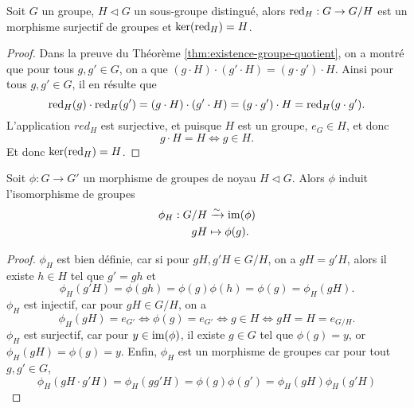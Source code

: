 \begin{proposition}
	Soit $G$ un groupe, $H \triangleleft G$ un sous-groupe distingué,
	alors $\operatorname{red}_H : G \to G/H$ est un morphisme surjectif de groupes
	et $\ker(\operatorname{red}_H) = H$.
\end{proposition}

\begin{proof}	
	Dans la preuve du Théorème \ref{thm:existence-groupe-quotient},
	on a montré que pour tous
	$g, g' \in G$, on a que $(g \cdot H) \cdot (g' \cdot H) = (g \cdot g') \cdot H$.
	Ainsi pour tous $g, g' \in G$, il en résulte que
	\begin{equation*}
		\operatorname{red}_H(g) \cdot \operatorname{red}_H(g') = (g \cdot H) \cdot (g' \cdot H)
		= (g \cdot g') \cdot H = \operatorname{red}_H(g \cdot g').
	\end{equation*}
	L'application $red_H$ est surjective, et puisque $H$ est un groupe, $e_G \in H$,
	et donc
	\begin{equation*}
		g \cdot H = H \iff g \in H.	
	\end{equation*}
	Et donc $\ker(\operatorname{red}_H) = H$.
\end{proof}

\begin{theorem}
	\label{thm:noyau-image}
	Soit $\phi : G \to G'$ un morphisme de groupes de noyau $H \triangleleft G$.
	Alors $\phi$ induit l'isomorphisme de groupes
	\begin{align*}
		\phi_H: G/H &\xrightarrow{\sim} \operatorname{im}(\phi)\\
		g H &\mapsto \phi(g).
	\end{align*}
\end{theorem}

\begin{proof}
	$\phi_H$ est bien définie, car si pour $g H, g'H \in G/H$, on a $gH = g'H$,
	alors il existe $h \in H$ tel que $g' = gh$ et
	\begin{equation*}
		\phi_H(g'H) = \phi(gh) = \phi(g)\phi(h) = \phi(g) = \phi_H(gH).
	\end{equation*}
	$\phi_H$ est injectif, car pour $gH \in G/H$, on a
	\begin{equation*}
		\phi_H(gH) = e_{G'} \iff \phi(g) = e_{G'} \iff g \in H \iff gH = H = e_{G/H}.
	\end{equation*}
	$\phi_H$ est surjectif, car pour $y \in \operatorname{im}(\phi)$, il existe $g \in G$ 
	tel que $\phi(g) = y$, or $\phi_H(gH) = \phi(g) = y$.
	Enfin, $\phi_H$ est un morphisme de groupes car pour tout $g, g' \in G$,
	\begin{equation*}
		\phi_H(gH \cdot g'H) = \phi_H(gg'H) = \phi(g)\phi(g') = \phi_H(gH)\phi_H(g'H)
	\end{equation*}
\end{proof}

